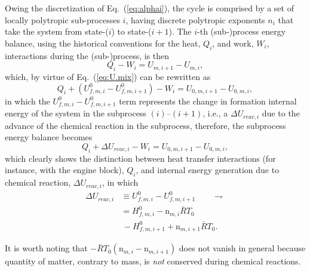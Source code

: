     Owing the discretization of Eq.~(\ref{eq:alphai}), the cycle is comprised by a set of locally polytropic sub-processes $i$, having discrete polytropic exponents $n_i$ that take the  system
    from state-($i$) to state-($i+1$). The $i$-th (sub-)process energy balance, using the historical conventions for the heat, $Q_i$, and work, $W_i$, interactions during the (sub-)process, is
    then%
    \begin{equation}
        Q_i - W_i                                   = U_{m,i+1} - U_{m,i},
        \label{eq:EnBal.1}
    \end{equation}
    \noindent which, by virtue of Eq.~(\ref{eq:U.mix}) can be rewritten as%
    \begin{equation}
        Q_i + (U^0_{f,m,i} - U^0_{f,m,i+1}) - W_i   = U_{0,m,i+1} - U_{0,m,i},
        \label{eq:EnBal.2}
    \end{equation}
    \noindent in which the $U^0_{f,m,i} - U^0_{f,m,i+1}$ term represents the change in formation internal energy of the system in the subprocess $(i)$--$(i+1)$, i.e., a $\Delta{U_{reac,i}}$
    due to the advance of the chemical reaction in the subprocess, therefore, the subprocess energy balance becomes%
    \begin{equation}
        Q_i + \Delta{U_{reac,i}} - W_i              = U_{0,m,i+1} - U_{0,m,i},
        \label{eq:EnBal.3}
    \end{equation}
    \noindent which clearly shows the distinction between heat transfer interactions (for instance, with the engine block), $Q_i$, and internal energy  generation  due  to  chemical  reaction,
    $\Delta{U_{reac,i}}$, in which%
    \begin{align}
        \Delta{U_{reac,i}}  &\equiv U^0_{f,m,i} - U^0_{f,m,i+1}     \qquad\rightharpoondown \\
                            &= H^0_{f,m,i} - \mathrm{n}_{m,i}\bar{R}T_0 \nonumber\\
                            &\,- H^0_{f,m,i+1} + \mathrm{n}_{m,i+1}\bar{R}T_0.
        \label{eq:dUreac}
    \end{align}

    It is worth noting that $-\bar{R}T_0(\mathrm{n}_{m,i} - \mathrm{n}_{m,i+1})$ does not vanish in general because quantity of  matter,  contrary  to  mass,  is  \emph{not}  conserved  during
    chemical reactions.

